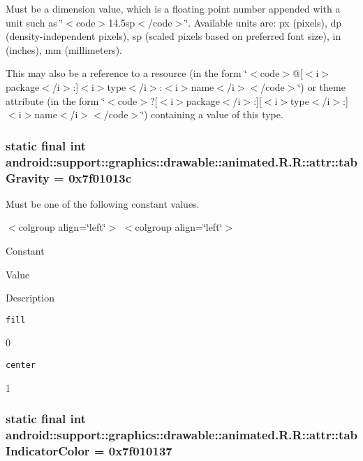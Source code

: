 Must be a dimension value, which is a floating point number appended with a unit such as \char`\"{}$<$code$>$14.5sp$<$/code$>$\char`\"{}. Available units are: px (pixels), dp (density-independent pixels), sp (scaled pixels based on preferred font size), in (inches), mm (millimeters). 

This may also be a reference to a resource (in the form \char`\"{}$<$code$>$@\mbox{[}$<$i$>$package$<$/i$>$:\mbox{]}$<$i$>$type$<$/i$>$:$<$i$>$name$<$/i$>$$<$/code$>$\char`\"{}) or theme attribute (in the form \char`\"{}$<$code$>$?\mbox{[}$<$i$>$package$<$/i$>$:\mbox{]}\mbox{[}$<$i$>$type$<$/i$>$:\mbox{]}$<$i$>$name$<$/i$>$$<$/code$>$\char`\"{}) containing a value of this type. \hypertarget{classandroid_1_1support_1_1graphics_1_1drawable_1_1animated_1_1_r_1_1attr_c251b7e60c41fccac7efb337640e2128}{
\subsubsection[{tabGravity}]{\setlength{\rightskip}{0pt plus 5cm}static final int android::support::graphics::drawable::animated.R.R::attr::tabGravity = 0x7f01013c}}
\label{classandroid_1_1support_1_1graphics_1_1drawable_1_1animated_1_1_r_1_1attr_c251b7e60c41fccac7efb337640e2128}


Must be one of the following constant values. \begin{TabularC}{0}
\hline
\end{TabularC}
$<$colgroup align=\char`\"{}left\char`\"{}$>$ $<$colgroup align=\char`\"{}left\char`\"{}$>$ 

Constant

Value

Description 

{\tt fill}

0

{\tt center}

1\hypertarget{classandroid_1_1support_1_1graphics_1_1drawable_1_1animated_1_1_r_1_1attr_b5a08ca4840b92a4626f8c36cd0f0fc6}{
\subsubsection[{tabIndicatorColor}]{\setlength{\rightskip}{0pt plus 5cm}static final int android::support::graphics::drawable::animated.R.R::attr::tabIndicatorColor = 0x7f010137}}
\label{classandroid_1_1support_1_1graphics_1_1drawable_1_1animated_1_1_r_1_1attr_b5a08ca4840b92a4626f8c36cd0f0fc6}


